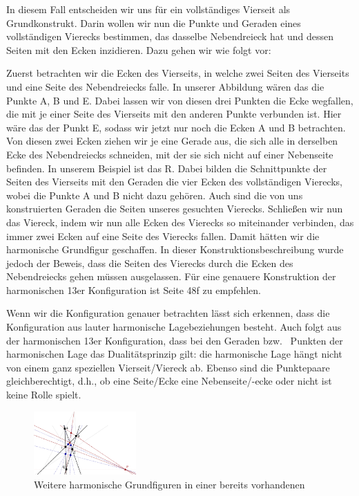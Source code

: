 \documentclass[12pt,a4paper]{article}
\begin{document}
In diesem Fall entscheiden wir uns für ein vollständiges Vierseit als Grundkonstrukt. Darin wollen wir nun die Punkte und Geraden eines vollständigen Vierecks bestimmen, das dasselbe Nebendreieck hat und dessen Seiten mit den Ecken inzidieren. Dazu gehen wir wie folgt vor:

Zuerst betrachten wir die Ecken des Vierseits, in welche zwei Seiten des Vierseits und eine Seite des Nebendreiecks falle. In unserer Abbildung wären das die Punkte A, B und E. Dabei lassen wir von diesen drei Punkten die Ecke wegfallen, die mit je einer Seite des Vierseits mit den anderen Punkte verbunden ist. Hier wäre das der Punkt E, sodass wir jetzt nur noch die Ecken A und B betrachten. Von diesen zwei Ecken ziehen wir je eine Gerade aus, die sich alle in derselben Ecke des Nebendreiecks schneiden, mit der sie sich nicht auf einer Nebenseite befinden. In unserem Beispiel ist das R. Dabei bilden die Schnittpunkte der Seiten des Vierseits mit den Geraden die vier Ecken des vollständigen Vierecks, wobei die Punkte A und B nicht dazu gehören. Auch sind die von uns konstruierten Geraden die Seiten unseres gesuchten Vierecks. Schließen wir nun das Viereck, indem wir nun alle Ecken des Vierecks so miteinander verbinden, das immer zwei Ecken auf eine Seite des Vierecks fallen.
\newline
\newline
Damit hätten wir die harmonische Grundfigur geschaffen. In dieser Konstruktionsbeschreibung wurde jedoch der Beweis, dass die Seiten des Vierecks durch die Ecken des Nebendreiecks gehen müssen ausgelassen. Für eine genauere Konstruktion der harmonischen 13er Konfiguration ist \citep{projektiveGeometrie} Seite 48f zu empfehlen.

Wenn wir die Konfiguration genauer betrachten lässt sich erkennen, dass die Konfiguration aus lauter harmonische Lagebeziehungen besteht. Auch folgt aus der harmonischen 13er Konfiguration, dass bei den Geraden bzw.~ Punkten der harmonischen Lage das Dualitätsprinzip gilt: die harmonische Lage hängt nicht von einem ganz speziellen Vierseit/Viereck ab. Ebenso sind die Punktepaare gleichberechtigt, d.h., ob eine Seite/Ecke eine Nebenseite/-ecke oder nicht ist keine Rolle spielt.
\newline

\begin{figure}
\centering
\includegraphics[width=0.35\textwidth]{Bilder/13_neu.png}
\caption{Weitere harmonische Grundfiguren in einer bereits vorhandenen}
\label{fig:13Neu}
\end{figure}
\end{document}
